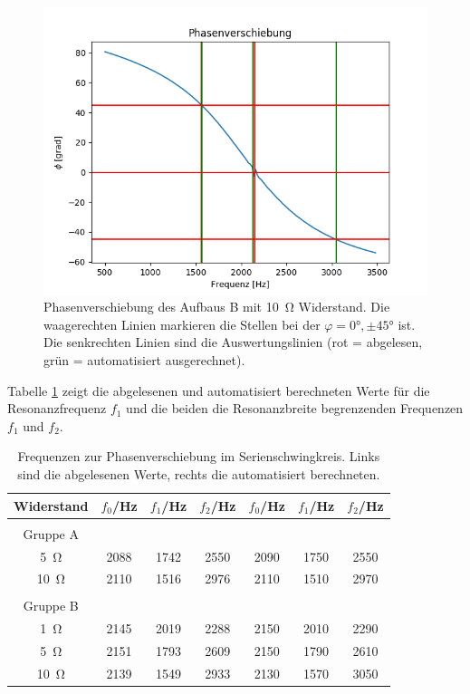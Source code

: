 \documentclass[12pt,a4paper]{article}
\begin{document}
\begin{figure}
	\centering
	\includegraphics[scale=0.8]{Bilder/Serie_Phasenverschiebung_B_10.png}
	\caption{Phasenverschiebung des Aufbaus B mit \SI{10}{\ohm} Widerstand. Die waagerechten Linien markieren die Stellen bei der $\varphi = \ang{0}, \pm \ang{45}$ ist. Die senkrechten Linien sind die Auswertungslinien (rot = abgelesen, grün = automatisiert ausgerechnet).}
	\label{fig:Serie_Phasenverschiebung_B_10}
\end{figure}



Tabelle \ref{tab:StromPhasenverschiebung} zeigt die abgelesenen und automatisiert berechneten Werte für die Resonanzfrequenz $f_1$ und die beiden die Resonanzbreite begrenzenden Frequenzen $f_1$ und $f_2$.


\begin{table}
	\centering
	\begin{tabular}{|c|c|c|c||c|c|c|}
		\hline
		Widerstand & $f_0$/Hz & $f_1$/Hz & $f_2$/Hz & $f_0$/Hz & $f_1$/Hz & $f_2$/Hz \\
		\hline
		&&&&&&\\
		Gruppe A &&&&&&  \\
		\hline
		\SI{5}{\ohm} & 2088 & 1742 & 2550 & 2090 & 1750 & 2550 \\
		\hline
		\SI{10}{\ohm} & 2110 & 1516 & 2976 & 2110 & 1510 & 2970 \\
		\hline
		&&&&&&\\
		Gruppe B &&&&&&\\
		\hline
		\SI{1}{\ohm} & 2145 & 2019 & 2288 & 2150 & 2010 & 2290 \\
		\hline
		\SI{5}{\ohm} & 2151 & 1793 & 2609 & 2150 & 1790 & 2610 \\
		\hline
		\SI{10}{\ohm} & 2139 & 1549 & 2933 & 2130 & 1570 & 3050 \\
		\hline
	\end{tabular}
	\caption{Frequenzen zur Phasenverschiebung im Serienschwingkreis. Links sind die abgelesenen Werte, rechts die automatisiert berechneten.}
	\label{tab:StromPhasenverschiebung}
\end{table}
\end{document}
